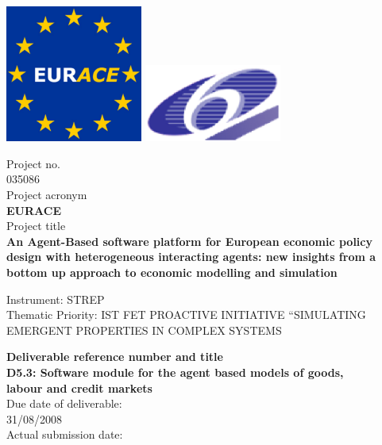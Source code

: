 \documentclass[a4paper,11pt]{article}
\begin{document}
\thispagestyle{empty}

\vspace{\baselineskip}
\includegraphics[width=45mm]{EURACE-Flag.eps} \hfill
\includegraphics[width=45mm]{eu_6.eps}

\begin{center}
Project no.\\
035086\\
Project acronym\\
{\bf EURACE}\\
Project title\\
{\bf An Agent-Based software platform for European economic policy design with heterogeneous interacting agents: new insights from a bottom up approach to economic modelling and simulation}\\
\end{center}

\vspace*{\baselineskip}\noindent
Instrument: STREP\\[\baselineskip]
Thematic Priority: IST FET PROACTIVE INITIATIVE ``SIMULATING EMERGENT PROPERTIES IN COMPLEX SYSTEMS\\

\vspace*{2\baselineskip}
\begin{center}
{\bf
Deliverable reference number and title\\
D5.3: Software module for the agent based models of goods,\\
labour and credit
markets\\ }
Due date of deliverable:\\
31/08/2008\\
Actual submission date:\\
\end{center}
\end{document}
